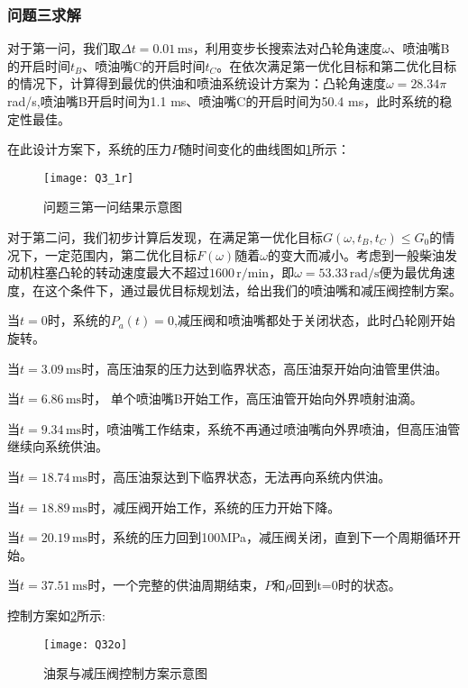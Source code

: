 \documentclass[withoutpreface,bwprint]{cumcmthesis} %
\begin{document}
\subsubsection{问题三求解}

对于第一问，我们取$\Delta t=0.01\,\text{ms}$，利用变步长搜索法对凸轮角速度$ω$、喷油嘴B的开启时间$t_{B}$、喷油嘴C的开启时间$t_{C}$。在依次满足第一优化目标和第二优化目标的情况下，计算得到最优的供油和喷油系统设计方案为：凸轮角速度$\omega=28.34\pi\,$rad/s,喷油嘴B开启时间为1.1 ms、喷油嘴C的开启时间为50.4 ms，此时系统的稳定性最佳。



在此设计方案下，系统的压力$P$随时间变化的曲线图如\cref{fig:Q3_1r}所示：

\clearpage

\begin{figure}[!h]
	\centering
	\texttt{[image: Q3\_1r]}
	\caption{问题三第一问结果示意图}
	\label{fig:Q3_1r}
\end{figure}


对于第二问，我们初步计算后发现，在满足第一优化目标$G(\omega,t_{B},t_{C}) \le G_{0}$的情况下，一定范围内，第二优化目标$F(\omega)$随着$\omega$的变大而减小。考虑到一般柴油发动机柱塞凸轮的转动速度最大不超过$1600\,\text{r/min}$，即$\omega=53.33\,\text{rad/s}$便为最优角速度，在这个条件下，通过最优目标规划法，给出我们的喷油嘴和减压阀控制方案。



当$t=0$时，系统的$P_{a}(t)=0$,减压阀和喷油嘴都处于关闭状态，此时凸轮刚开始旋转。

当$t=3.09\,\text{ms}$时，高压油泵的压力达到临界状态，高压油泵开始向油管里供油。

当$t=6.86\,\text{ms}$时， 单个喷油嘴B开始工作，高压油管开始向外界喷射油滴。

当$t=9.34\,\text{ms}$时，喷油嘴工作结束，系统不再通过喷油嘴向外界喷油，但高压油管继续向系统供油。 

当$t=18.74\,\text{ms}$时，高压油泵达到下临界状态，无法再向系统内供油。

当$t=18.89\,\text{ms}$时，减压阀开始工作，系统的压力开始下降。 

当$t=20.19\,\text{ms}$时，系统的压力回到100MPa，减压阀关闭，直到下一个周期循环开始。

当$t=37.51\,\text{ms}$时，一个完整的供油周期结束，$P$和$\rho$回到t=0时的状态。

控制方案如\cref{fig:Q32o}所示:


\begin{figure}[!h]
	\centering
	\texttt{[image: Q32o]}
	\caption{油泵与减压阀控制方案示意图}
	\label{fig:Q32o}
\end{figure}
\end{document}
